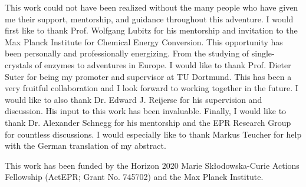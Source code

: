 
This work could not have been realized without the many people who have given me their support, mentorship, and guidance throughout this adventure. I would first like to thank Prof. Wolfgang Lubitz for his mentorship and invitation to the Max Planck Institute for Chemical Energy Conversion. This opportunity has been personally and professionally energizing. From the studying of single-crystals of enzymes to adventures in Europe. I would like to thank Prof. Dieter Suter for being my promoter and supervisor at TU Dortmund. This has been a very fruitful collaboration and I look forward to working together in the future. I would like to also thank Dr. Edward J. Reijerse for his supervision and discussion. His input to this work has been invaluable. Finally, I would like to thank Dr. Alexander Schnegg for his mentorship and the EPR Research Group for countless discussions. I would especially like to thank Markus Teucher for help with the German translation of my abstract. 

This work has been funded by the Horizon 2020 Marie Sk\l{}odowska-Curie Actions Fellowship (ActEPR; Grant No. 745702) and the Max Planck Institute. 

